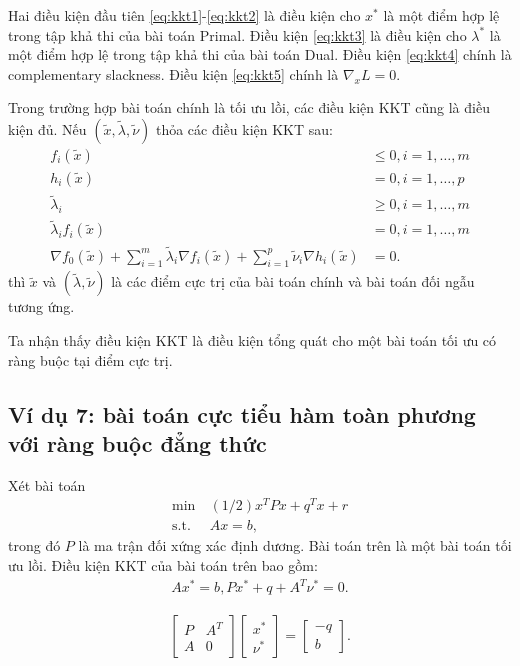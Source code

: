 \documentclass{book}
\begin{document}
Hai điều kiện đầu tiên \eqref{eq:kkt1}-\eqref{eq:kkt2} là điều kiện cho $x^*$ là một điểm hợp lệ trong tập khả thi của bài toán Primal.
Điều kiện \eqref{eq:kkt3} là điều kiện cho $\lambda^*$ là một điểm hợp lệ trong tập khả thi của bài toán Dual.
Điều kiện \eqref{eq:kkt4} chính là complementary slackness.
Điều kiện \eqref{eq:kkt5} chính là $\nabla_x L = 0$. 

Trong trường hợp bài toán chính là tối ưu lồi, các điều kiện KKT cũng là điều kiện đủ.
Nếu $(\tilde{x}, \tilde{\lambda}, \tilde{\nu})$ thỏa các điều kiện KKT sau:
\begin{align*}
f_i(\tilde{x}) & \leq 0, i = 1, \ldots , m\\
h_i(\tilde{x}) & = 0, i = 1, \ldots , p \\
\tilde{\lambda}_i & \geq 0, i = 1, \ldots , m \\
\tilde{\lambda}_i f_i(\tilde{x}) & = 0, i = 1, \ldots , m\\
\nabla f_0(\tilde{x}) + \sum_{i = 1}^m \tilde{\lambda}_i \nabla f_i(\tilde{x}) + \sum_{i = 1}^p \tilde{\nu}_i \nabla h_i(\tilde{x}) & = 0.
\end{align*}
thì $\tilde{x}$ và $(\tilde{\lambda}, \tilde{\nu})$ là các điểm cực trị của bài toán chính và bài toán đối ngẫu tương ứng.

Ta nhận thấy điều kiện KKT là điều kiện tổng quát cho một bài toán tối ưu có ràng buộc tại điểm cực trị.

\subsection*{Ví dụ 7: bài toán cực tiểu hàm toàn phương với ràng buộc đẳng thức}
Xét bài toán
\begin{align*}
\min ~ & (1/2) x^T Px + q^Tx + r \\
\mathrm{s.t.} ~ & Ax = b,
\end{align*}
trong đó $P$ là ma trận đối xứng xác định dương. Bài toán trên là một bài toán tối ưu lồi.
Điều kiện KKT của bài toán trên bao gồm:
\begin{align*}
A x^* = b, Px^* + q + A^T \nu^* = 0.
\end{align*}

\begin{align*}
\begin{bmatrix} P & A^T \\ A & 0 \end{bmatrix} \begin{bmatrix} x^* \\ \nu^* \end{bmatrix} = \begin{bmatrix} -q \\ b \end{bmatrix}.
\end{align*}
\end{document}
